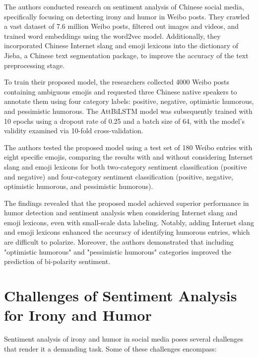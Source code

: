 \documentclass[a4paper]{article}
\begin{document}
The authors conducted research on sentiment analysis of Chinese social media, specifically focusing on detecting irony and humor in Weibo posts. They crawled a vast dataset of 7.6 million Weibo posts, filtered out images and videos, and trained word embeddings using the word2vec model. Additionally, they incorporated Chinese Internet slang and emoji lexicons into the dictionary of Jieba, a Chinese text segmentation package, to improve the accuracy of the text preprocessing stage.

To train their proposed model, the researchers collected 4000 Weibo posts containing ambiguous emojis and requested three Chinese native speakers to annotate them using four category labels: positive, negative, optimistic humorous, and pessimistic humorous. The AttBiLSTM model was subsequently trained with 10 epochs using a dropout rate of 0.25 and a batch size of 64, with the model's validity examined via 10-fold cross-validation.

The authors tested the proposed model using a test set of 180 Weibo entries with eight specific emojis, comparing the results with and without considering Internet slang and emoji lexicons for both two-category sentiment classification (positive and negative) and four-category sentiment classification (positive, negative, optimistic humorous, and pessimistic humorous).

The findings revealed that the proposed model achieved superior performance in humor detection and sentiment analysis when considering Internet slang and emoji lexicons, even with small-scale data labeling. Notably, adding Internet slang and emoji lexicons enhanced the accuracy of identifying humorous entries, which are difficult to polarize. Moreover, the authors demonstrated that including "optimistic humorous" and "pessimistic humorous" categories improved the prediction of bi-polarity sentiment.


\section{Challenges of Sentiment Analysis for Irony and Humor}
Sentiment analysis of irony and humor in social media poses several challenges that render it a demanding task. Some of these challenges encompass:
\end{document}
